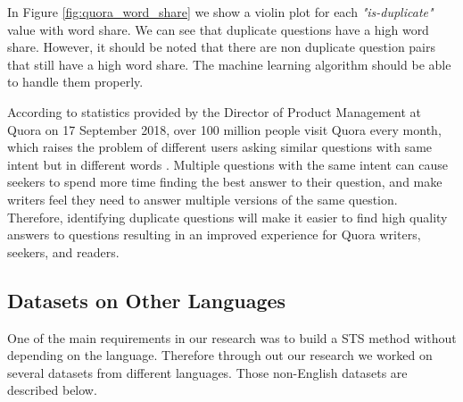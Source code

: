\begin{enumerate}
In Figure \ref{fig:quora_word_share} we show a violin plot for each \textit{"is-duplicate"} value with word share. We can see that duplicate questions have a high word share. However, it should be noted that there are non duplicate question pairs that still have a high word share. The machine learning algorithm should be able to handle them properly. 

According to statistics provided by the Director of Product Management at Quora on 17 September 2018, over 100 million people visit Quora every month, which raises the problem of different users asking similar questions with same intent but in different words \cite{8967103}. Multiple questions with the same intent can cause seekers to spend more time finding the best answer to their question, and make writers feel they need to answer multiple versions of the same question. Therefore, identifying duplicate questions will make it easier to find high quality answers to questions resulting in an improved experience for Quora writers, seekers, and readers.


\end{enumerate}

\subsection{Datasets on Other Languages}
One of the main requirements in our research was to build a STS method without depending on the language. Therefore through out our research we worked on several datasets from different languages. Those non-English datasets are described below. 
  
